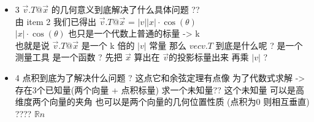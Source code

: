 \documentclass[12pt]{article}
\begin{document}
\begin{flushleft}
\begin{itemize}
              那么我们需要求出 $|c|$ 也就是向量 c 的长度, 使用余弦定理定于: \\
              $|c|^{2} = |v|^{2} + |x|^{2} - 2|v||x| \cdot \cos({θ}) = p1$  \\
              我们已知道向量定义 任意向量的坐标 = 它的终点坐标 - 起点坐标 (设在2维) \\
              $\vec{c} = \begin{bmatrix}
                      (v_{1} - x_{1}),(v_{2} - x_{2})
                  \end{bmatrix}$ \\
              $|c|= \sqrt{(v_{1} - x_{1})^{2} + (v_{2} - x_{2})^{2}}$ \\
              $=|c|^{2} = (v_{1} - x_{1})^{2} + (v_{2} - x_{2})^{2} $  \\
              $= v_{1}^{2} - 2v_{1}x_{1} + x_{1}^{2} + v_{2}^{2} - 2v_{2}x_{2} + x_{2}^{2} $
              $= (x_{1}^{2} + x_{2}^{2}) + (v_{1}^{2} + v_{2}^{2}) - 2 \cdot (x_{1}v_{1} + x_{2}v_{2})$
              $= |\vec{x}|^{2}  + |\vec{v}|^{2} -  2 \cdot (x_{1}v_{1} + x_{2}v_{2}) = p2$  \\
              $ p1 = p2  ->  x_{1}v_{1} + x_{2}v_{2} =  |v||x| \cdot \cos({θ}) $ \\
              p1是几何的基于三角形余弦定理 p2是代数的基于向量代数运算 它们在这里是属于同一事物的两种描述 \\
              $|x| \cdot \cos({θ})$ 是 $\vec{x}$ 在 $\vec{v}$ 的投影长度 $\cos({θ})$ 是 $\vec{x}$ 和 $\vec{v}$
              的夹角 \\

        \item 3 $\vec{v}.T @ \vec{x}$ 的几何意义到底解决了什么具体问题 ?? \\
              由 item 2 我们已得出  $\vec{v}.T @ \vec{x}$ = $ |v||x| \cdot \cos({θ}) $ \\
              $|x| \cdot \cos({θ})$ 也只是一个代数上普通的标量 -> k \\
              也就是说  $\vec{v}.T @ \vec{x}$ 是一个 k 倍的 $|v|$ 常量 那么 $vec{v}.T$ 到底是什么呢 ?
              是一个测量工具 是一个函数 ? 先把 $\vec{x}$ 算出在 $\vec{v}$的投影标量出来 再乘 $|v|$ ?

        \item 4  点积到底为了解决什么问题 ?
              这点它和余弦定理有点像 为了代数式求解 -> 存在3个已知量(两个向量 + 点积标量) 求一个未知量??
              这个未知量 可以是高维度两个向量的夹角 也可以是两个向量的几何位置性质 (点积为0 则相互垂直) ????
              $\mathbb{R}{n}$

    \end{itemize}

\end{flushleft}
\end{document}
